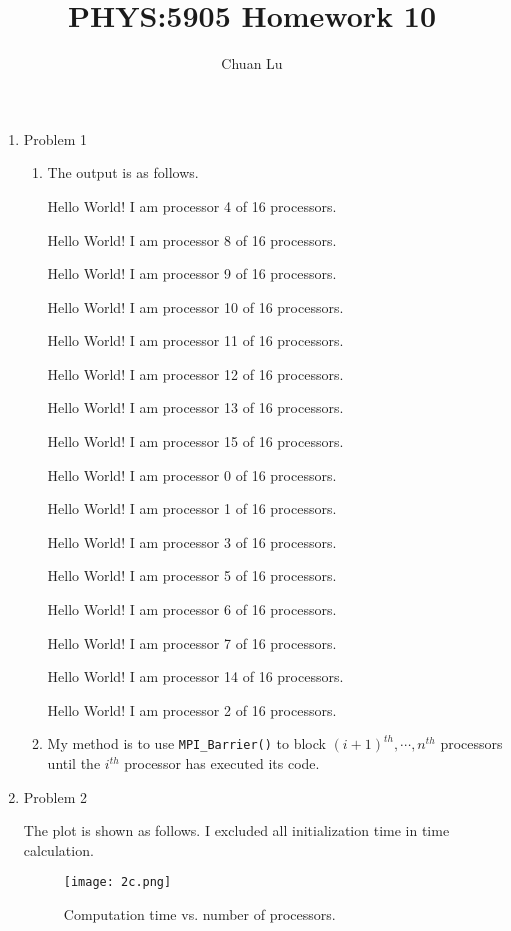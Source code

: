 \documentclass{article}
\begin{document}
\author{Chuan Lu}
\title{PHYS:5905 Homework 10}
\maketitle

\medskip

\begin{enumerate}

\item Problem 1

\begin{enumerate}

\item The output is as follows.

Hello World! I am processor 4 of 16 processors.

Hello World! I am processor 8 of 16 processors.

Hello World! I am processor 9 of 16 processors.

Hello World! I am processor 10 of 16 processors.

Hello World! I am processor 11 of 16 processors.

Hello World! I am processor 12 of 16 processors.

Hello World! I am processor 13 of 16 processors.

Hello World! I am processor 15 of 16 processors.

Hello World! I am processor 0 of 16 processors.

Hello World! I am processor 1 of 16 processors.

Hello World! I am processor 3 of 16 processors.

Hello World! I am processor 5 of 16 processors.

Hello World! I am processor 6 of 16 processors.

Hello World! I am processor 7 of 16 processors.

Hello World! I am processor 14 of 16 processors.

Hello World! I am processor 2 of 16 processors.

\item My method is to use \texttt{MPI\_Barrier()} to block $(i+1)^{th}, \cdots, n^{th} $ processors until the $i^{th} $ processor has executed its code.

\end{enumerate}

\item Problem 2

The plot is shown as follows. I excluded all initialization time in time calculation.

\begin{figure}
\centering
\texttt{[image: 2c.png]}
\caption{Computation time vs. number of processors.}
\label{1}
\end{figure}


\end{enumerate}
\end{document}
